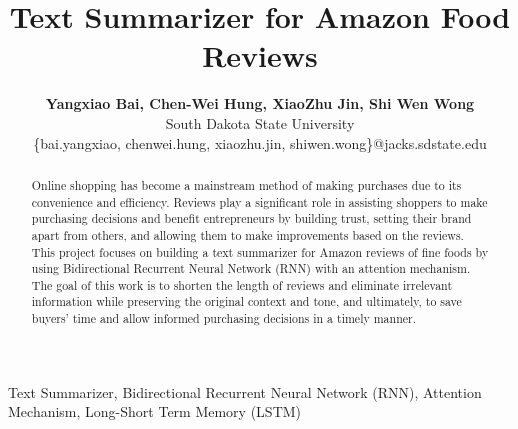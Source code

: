 \documentclass[conference]{IEEEtran}
\begin{document}
\title{\textbf{Text Summarizer for Amazon Food Reviews}\\}
\author{\textbf{\Large{Yangxiao Bai, Chen-Wei Hung, XiaoZhu Jin, Shi Wen Wong}} \\
South Dakota State University \\
\{bai.yangxiao, chenwei.hung, xiaozhu.jin, shiwen.wong\}@jacks.sdstate.edu \\
}

\maketitle

\begin{abstract}
Online shopping has become a mainstream method of making purchases due to its convenience and efficiency. Reviews play a significant role in assisting shoppers to make purchasing decisions and benefit entrepreneurs by building trust, setting their brand apart from others, and allowing them to make improvements based on the reviews. This project focuses on building a text summarizer for Amazon reviews of fine foods by using Bidirectional Recurrent Neural Network (RNN) with an attention mechanism. The goal of this work is to shorten the length of reviews and eliminate irrelevant information while preserving the original context and tone, and ultimately, to save buyers’ time and allow informed purchasing decisions in a timely manner. \\
\end{abstract} 

\begin{IEEEkeywords}
Text Summarizer, Bidirectional Recurrent Neural Network (RNN), Attention Mechanism, Long-Short Term Memory (LSTM)
\end{IEEEkeywords}
\end{document}
